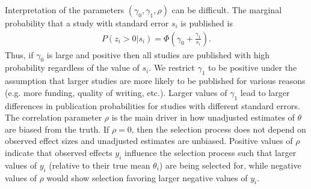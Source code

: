 \documentclass[12pt]{article}   	%
\numberwithin{equation}{section}
\begin{document}
Interpretation of the parameters $(\gamma_0, \gamma_1, \rho)$ can be difficult. The marginal probability that a study with standard error $s_i$ is published is 
\begin{align}
P(z_i > 0 \vert s_i) = \Phi(\gamma_0 + \frac{\gamma_1}{s_i}). \nonumber
\end{align}
Thus, if $\gamma_0$ is large and positive then all studies are published with high probability regardless of the value of $s_i$. We restrict $\gamma_1$ to be positive under the assumption that larger studies are more likely to be published for various reasons (e.g. more funding, quality of writing, etc.). Larger values of $\gamma_1$ lead to larger differences in publication probabilities for studies with different standard errors. The correlation parameter $\rho$ is the main driver in how unadjusted estimates of $\theta$ are biased from the truth. If $\rho = 0$, then the selection process does not depend on observed effect sizes and unadjusted estimates are unbiased. Positive values of $\rho$ indicate that observed effects $y_i$ influence the selection process such that larger values of $y_i$ (relative to their true mean $\theta_i$) are being selected for, while negative values of $\rho$ would show selection favoring larger negative values of $y_i$.
\end{document}

